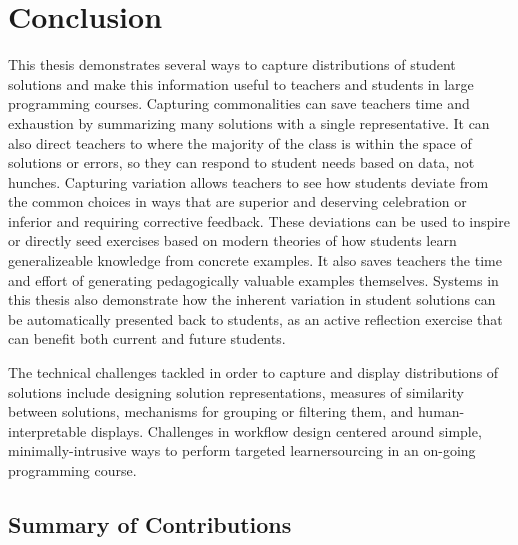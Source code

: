 \documentclass[12pt,twoside]{mitthesis}
\begin{document}

%
\pagestyle{plain}
%

\pagestyle{fancyplain}
\addtolength{\headheight}{\baselineskip}

%
%
%
%
%
%
%
%
\chapter{Conclusion}\label{chapter:conclusion}

This thesis demonstrates several ways to capture distributions of student solutions and make this information useful to teachers and students in large programming courses. Capturing commonalities can save teachers time and exhaustion by summarizing many solutions with a single representative. It can also direct teachers to where the majority of the class is within the space of solutions or errors, so they can respond to student needs based on data, not hunches. Capturing variation allows teachers to see how students deviate from the common choices in ways that are superior and deserving celebration or inferior and requiring corrective feedback. These deviations can be used to inspire or directly seed exercises based on modern theories of how students learn generalizeable knowledge from concrete examples. It also saves teachers the time and effort of generating pedagogically valuable examples themselves. Systems in this thesis also demonstrate how the inherent variation in student solutions can be automatically presented back to students, as an active reflection exercise that can benefit both current and future students. 

The technical challenges tackled in order to capture and display distributions of solutions include designing solution representations, measures of similarity between solutions, mechanisms for grouping or filtering them, and human-interpretable displays. Challenges in workflow design centered around simple, minimally-intrusive ways to perform targeted learnersourcing in an on-going programming course.

\section{Summary of Contributions}
\end{document}
